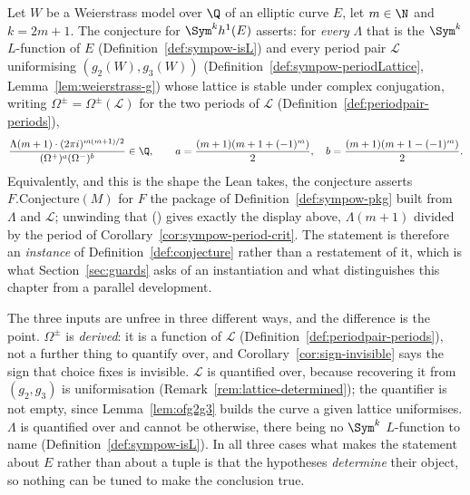 \begin{definition}
  \label{def:sympow-conjecture}
  Let $W$ be a Weierstrass model over $\Q$ of an elliptic curve $E$, let $m \in \N$ and
  $k = 2m+1$. The conjecture for $\Sym^{k}h^{1}(E)$ asserts: for \emph{every} $\Lambda$ that is
  the $\Sym^{k}$ $L$-function of $E$ (Definition~\ref{def:sympow-isL}) and every period pair
  $\mathcal{L}$ uniformising $(g_{2}(W), g_{3}(W))$
  (Definition~\ref{def:sympow-periodLattice}, Lemma~\ref{lem:weierstrass-g}) whose lattice is
  stable under complex conjugation, writing $\Omega^{\pm} = \Omega^{\pm}(\mathcal{L})$ for the
  two periods of $\mathcal{L}$ (Definition~\ref{def:periodpair-periods}),
  \[
    \frac{\Lambda(m+1)\cdot(2\pi i)^{m(m+1)/2}}{(\Omega^{+})^{a}(\Omega^{-})^{b}} \in \Q,
    \qquad
    a = \frac{(m+1)(m+1+(-1)^{m})}{2},\quad
    b = \frac{(m+1)(m+1-(-1)^{m})}{2}.
  \]
  Equivalently, and this is the shape the Lean takes, the conjecture asserts
  $F.\mathrm{Conjecture}(M)$ for $F$ the package of Definition~\ref{def:sympow-pkg} built
  from $\Lambda$ and $\mathcal{L}$;
  unwinding that () gives exactly the display
  above, $\Lambda(m+1)$ divided by the period of Corollary~\ref{cor:sympow-period-crit}.
  The statement is therefore an \emph{instance} of Definition~\ref{def:conjecture} rather than
  a restatement of it, which is what Section~\ref{sec:guards} asks of an instantiation and what
  distinguishes this chapter from a parallel development.

  The three inputs are unfree in three different ways, and the difference is the point.
  $\Omega^{\pm}$ is \emph{derived}: it is a function of $\mathcal{L}$
  (Definition~\ref{def:periodpair-periods}), not a further thing to quantify over, and
  Corollary~\ref{cor:sign-invisible} says the sign that choice fixes is invisible. $\mathcal{L}$
  is quantified over, because recovering it from $(g_{2},g_{3})$ is uniformisation
  (Remark~\ref{rem:lattice-determined}); the quantifier is not empty, since
  Lemma~\ref{lem:ofg2g3} builds the curve a given lattice uniformises. $\Lambda$ is quantified
  over and cannot be otherwise, there being no $\Sym^{k}$ $L$-function to name
  (Definition~\ref{def:sympow-isL}). In all three cases what makes the statement about $E$ rather
  than about a tuple is that the hypotheses \emph{determine} their object, so nothing can be
  tuned to make the conclusion true.


\end{definition}
